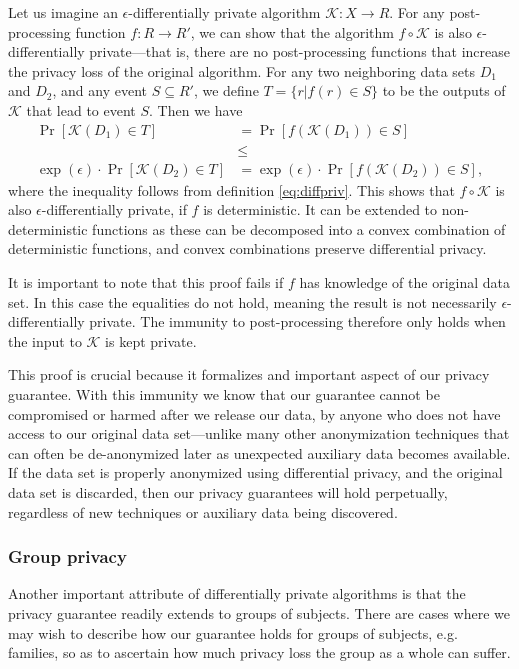 \documentclass[12pt]{article}
\newcommand{\todo}[1]{{\color{red}#1}}
\newcommand{\fancy}{\mathcal}
\begin{document}
Let us imagine an $\epsilon$-differentially private algorithm $\fancy{K} : X \to R$. For any post-processing function $f : R \to R'$, we can show that the algorithm $f \circ \fancy{K}$ is also $\epsilon$-differentially private---that is, there are no post-processing functions that increase the privacy loss of the original algorithm. For any two neighboring data sets $D_1$ and $D_2$, and any event $S \subseteq R'$, we define $T = \{r|f(r) \in S\}$ to be the outputs of $\fancy{K}$ that lead to event $S$. Then we have
\begin{align*}
    \Pr[\fancy{K}(D_1) \in T] &= \Pr[f(\fancy{K}(D_1)) \in S]  \\
    &\leq \\
    \exp(\epsilon)\cdot\Pr[\fancy{K}(D_2) \in T] &= \exp(\epsilon)\cdot\Pr[f(\fancy{K}(D_2)) \in S],
\end{align*}
where the inequality follows from definition \ref{eq:diffpriv}. This shows that $f \circ \fancy{K}$ is also $\epsilon$-differentially private, if $f$ is deterministic. It can be extended to non-deterministic functions \todo{as these can be decomposed into a convex combination of deterministic functions, and convex combinations preserve differential privacy}.

It is important to note that this proof fails if $f$ has knowledge of the original data set. In this case the equalities do not hold, meaning the result is not necessarily $\epsilon$-differentially private. The immunity to post-processing therefore only holds when the input to $\fancy{K}$ is kept private. \bigskip

This proof is crucial because it formalizes and important aspect of our privacy guarantee. With this immunity we know that our guarantee cannot be compromised or harmed after we release our data, by anyone who does not have access to our original data set---unlike many other anonymization techniques that can often be de-anonymized later as unexpected auxiliary data becomes available. If the data set is properly anonymized using differential privacy, and the original data set is discarded, then our privacy guarantees will hold perpetually, regardless of new techniques or auxiliary data being discovered.

\subsubsection{Group privacy}

Another important attribute of differentially private algorithms is that the privacy guarantee readily extends to groups of subjects. There are cases where we may wish to describe how our guarantee holds for groups of subjects, e.g. families, so as to ascertain how much privacy loss the group as a whole can suffer.
\end{document}
